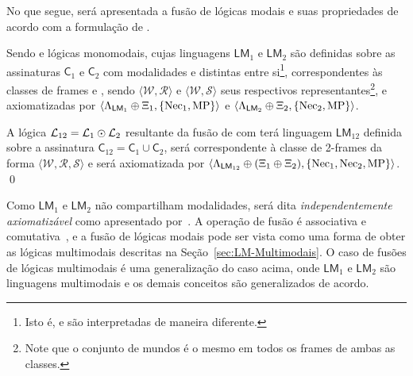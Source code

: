     No que segue, será apresentada a fusão de lógicas modais e suas propriedades de acordo com a formulação de .
    \begin{definicao}
        \label{def:Fusao}
        Sendo  e  lógicas monomodais, cujas linguagens \(\mathsf{LM}_1\) e \(\mathsf{LM}_2\) são definidas sobre as assinaturas
        \(\mathsf{C}_{1}\) e \(\mathsf{C}_{2}\) com modalidades  e  distintas entre si\footnote{Isto é,  e  são interpretadas de maneira diferente.},
        correspondentes às classes de frames  e , sendo \(\langle \mathcal{W}, \mathcal{R}\rangle\) e \(\langle \mathcal{W}, \mathcal{S}\rangle\)
        seus respectivos representantes\footnote{Note que o conjunto de mundos  é o mesmo em todos os frames de ambas as classes.}, e
        axiomatizadas por \(\langle\Lambda_{\mathsf{LM}_1} \mathbin{\oplus} \Xi_1, \{\operatorname{Nec}_{1}, \operatorname{MP}\}\rangle\) e
        \(\langle\Lambda_{\mathsf{LM}_2} \mathbin{\oplus} \Xi_2, \{\operatorname{Nec}_2, \operatorname{MP}\}\rangle\).

        A lógica \(\mathcal{L}_{12} = \mathcal{L}_1 \mathbin{\odot} \mathcal{L}_2\) resultante da fusão de  com  terá linguagem
        \(\mathsf{LM}_{12}\) definida sobre a assinatura \(\mathsf{C}_{12} = \mathsf{C}_1 \cup \mathsf{C}_2\), será correspondente à classe 
        de 2-frames da forma \(\langle \mathcal{W}, \mathcal{R}, \mathcal{S}\rangle\) e será axiomatizada por
        \(\langle\Lambda_{\mathsf{LM}_{12}} \mathbin{\oplus} (\Xi_1 \mathbin{\oplus} \Xi_2), \{\operatorname{Nec}_1, \operatorname{Nec}_2, \operatorname{MP}\}\rangle\). \qed
    \end{definicao}

    Como \(\mathsf{LM}_1\) e \(\mathsf{LM}_2\) não compartilham modalidades,  será dita \textit{independentemente axiomatizável} como apresentado
    por~. A operação de fusão é associativa e comutativa~\cite{gabbay2003many}, e a fusão de lógicas modais
    pode ser vista como uma forma de obter as lógicas multimodais descritas na Seção~\ref{sec:LM-Multimodais}. O caso de fusões de lógicas multimodais
    é uma generalização do caso acima, onde \(\mathsf{LM}_1\) e \(\mathsf{LM}_2\) são linguagens multimodais e os demais conceitos são generalizados de acordo.

